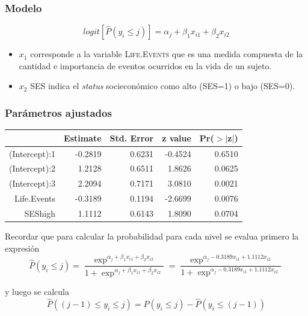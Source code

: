 \documentclass[]{beamer}
\begin{document}
\begin{frame}
	\frametitle{Modelo}
	
	$$logit[\widehat{P}(y_i\leq j)] =\alpha_j + \beta_{1}x_{i1}+ \beta_{2}x_{i2} $$
	
	\begin{itemize}
		\item 	$x_{1}$ corresponde a la variable \textsc{Life.Events} que es una medida compuesta de la cantidad e importancia de eventos ocurridos en la vida de un sujeto.
	
	   \item $x_{2}$ \textsc{SES} indica el \textit{status} socieconómico como alto (SES=1) o bajo (SES=0). 
	
	\end{itemize}

\end{frame}


\begin{frame}
	\frametitle{Parámetros ajustados}
	
	

\begin{table}[ht]
\centering
\begin{tabular}{rrrrr}
  \hline
 & Estimate & Std. Error & z value & Pr($>$$|$z$|$) \\ 
  \hline
(Intercept):1 & -0.2819 & 0.6231 & -0.4524 & 0.6510 \\ 
  (Intercept):2 & 1.2128 & 0.6511 & 1.8626 & 0.0625 \\ 
  (Intercept):3 & 2.2094 & 0.7171 & 3.0810 & 0.0021 \\ 
  Life.Events & -0.3189 & 0.1194 & -2.6699 & 0.0076 \\ 
  SEShigh & 1.1112 & 0.6143 & 1.8090 & 0.0704 \\ 
   \hline
\end{tabular}
\end{table}


Recordar que para calcular la probabilidad para cada nivel se evalua primero la expresión
$$\widehat{P}(y_i\leq j) =\frac{\exp^{\alpha_j + \beta_{1}x_{i1}+ \beta_{2}x_{i2}}}{1+ \exp^{\alpha_j + \beta_{1}x_{i1}+ \beta_{2}x_{i2}}}= \frac{\exp^{\alpha_j -0.3189x_{i1}+ 1.1112x_{i2}}}{1+ \exp^{\alpha_j -0.3189x_{i1}+ 1.1112x_{i2}}} $$

y luego se calcula $$\widehat{P}((j-1)\leq y_i\leq j)= \widehat{P}(y_i\leq j)  - \widehat{P}(y_i\leq (j-1))$$

\end{frame}
\end{document}
